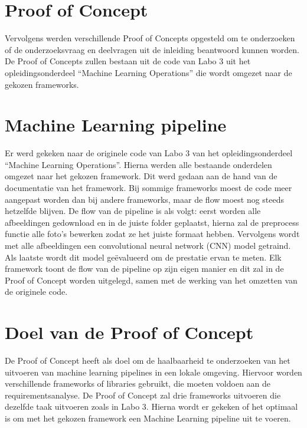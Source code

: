 \section{Proof of Concept}
Vervolgens werden verschillende Proof of Concepts opgesteld om te onderzoeken of de onderzoeksvraag en deelvragen uit de inleiding beantwoord kunnen worden. De Proof of Concepts zullen bestaan uit de code van Labo 3 uit het opleidingsonderdeel ``Machine Learning Operations'' die wordt omgezet naar de gekozen frameworks.
\section{Machine Learning pipeline}
Er werd gekeken naar de originele code van Labo 3 van het opleidingsonderdeel ``Machine Learning Operations''. Hierna werden alle bestaande onderdelen omgezet naar het gekozen framework. Dit werd gedaan aan de hand van de documentatie van het framework. Bij sommige frameworks moest de code meer aangepast worden dan bij andere frameworks, maar de flow moest nog steeds hetzelfde blijven.
De flow van de pipeline is als volgt: eerst worden alle afbeeldingen gedownload en in de juiste folder geplaatst, hierna zal de preprocess functie alle foto's bewerken zodat ze het juiste formaat hebben. Vervolgens wordt met alle afbeeldingen een convolutional neural network (CNN) model getraind. Als laatste wordt dit model geëvalueerd om de prestatie ervan te meten.
Elk framework toont de flow van de pipeline op zijn eigen manier en dit zal in de Proof of Concept worden uitgelegd, samen met de werking van het omzetten van de originele code.
\section{Doel van de Proof of Concept}
De Proof of Concept heeft als doel om de haalbaarheid te onderzoeken van het uitvoeren van machine learning pipelines in een lokale omgeving. Hiervoor worden verschillende frameworks of libraries gebruikt, die moeten voldoen aan de requirementsanalyse. De Proof of Concept zal drie frameworks uitvoeren die dezelfde taak uitvoeren zoals in Labo 3. Hierna wordt er gekeken of het optimaal is om met het gekozen framework een Machine Learning pipeline uit te voeren.
